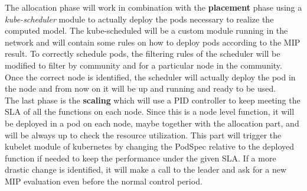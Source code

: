 The allocation phase will work in combination with the \textbf{placement} phase using a
\textit{kube-scheduler} module to actually deploy the pods necessary to realize the 
computed model. The kube-scheduled will be a custom module running in the network and will
contain some rules on how to deploy pods according to the MIP result. To correctly schedule 
pods, the filtering rules of the scheduler will be modified to filter by community and for 
a particular node in the community. Once the correct node is identified, the scheduler will 
actually deploy the pod in the node and from now on it will be up and running and ready to 
be used. \\

The last phase is the \textbf{scaling} which will use a PID controller to keep meeting the
SLA of all the functions on each node. Since this is a node level function, it will be
deployed in a pod on each node, maybe together with the allocation part, and will be always
up to check the resource utilization. This part will trigger the kubelet module of kubernetes
by changing the PodSpec relative to the deployed function if needed to keep the performance
under the given SLA. If a more drastic change is identified, it will make a call to the 
leader and ask for a new MIP evaluation even before the normal control period. 


